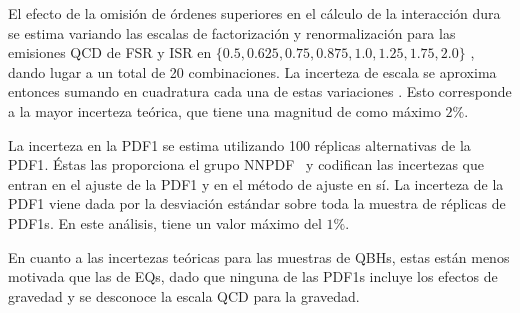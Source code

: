 El efecto de la omisión de órdenes superiores en el cálculo de la interacción dura se estima variando las escalas de factorización y renormalización para las emisiones \ac{QCD} de \ac{FSR} y \ac{ISR} en \(\{0.5, 0.625, 0.75, 0.875, 1.0, 1.25, 1.75, 2.0\}\)
, dando lugar a un total de 20 combinaciones. La incerteza de escala se aproxima entonces sumando en cuadratura cada una de estas variaciones
. Esto corresponde a la mayor incerteza teórica, que tiene una magnitud de como máximo \(2\%\).

La incerteza en la \ac{PDF1} se estima utilizando 100 réplicas alternativas de la \ac{PDF1}. Éstas las proporciona el grupo NNPDF~\cite{NNPDF2} y codifican las incertezas que entran en el ajuste de la \ac{PDF1} y en el método de ajuste en sí. La incerteza de la \ac{PDF1} viene dada por la desviación estándar sobre toda la muestra de réplicas de \acp{PDF1}. En este análisis, tiene un valor m\'aximo del \(1\%\).


En cuanto a las incertezas teóricas para las muestras de \acp{QBH}, estas están menos motivada que las de \acp{EQ}, dado que ninguna de las \acp{PDF1} incluye los efectos de gravedad y se desconoce la escala \ac{QCD} para la gravedad.